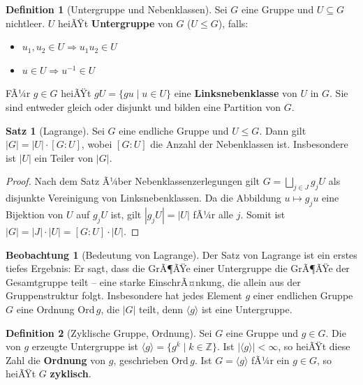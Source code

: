 ﻿\documentclass[a4paper,12pt]{report}
\theoremstyle{definition}
\newtheorem{definition}{Definition}
\newtheorem{satz}{Satz}
\newtheorem{beobachtung}{Beobachtung}
\begin{document}
\begin{definition}[Untergruppe und Nebenklassen]
    Sei $G$ eine Gruppe und $U \subseteq G$ nichtleer. $U$ heiÃŸt
    \textbf{Untergruppe} von $G$ ($U \le G$), falls:
    \begin{itemize}
        \item[-] $u_1, u_2 \in U \Rightarrow u_1 u_2 \in U$
        \item[-] $u \in U \Rightarrow u^{-1} \in U$
    \end{itemize}
    FÃ¼r $g \in G$ heiÃŸt $gU = \{gu \mid u \in U\}$ eine \textbf{Linksnebenklasse}
    von $U$ in $G$. Sie sind entweder gleich oder disjunkt und bilden eine
    Partition von $G$.
\end{definition}

\begin{satz}[Lagrange]
    Sei $G$ eine endliche Gruppe und $U \le G$. Dann gilt $|G| = |U| \cdot [G:U]$,
    wobei $[G:U]$ die Anzahl der Nebenklassen ist. Insbesondere ist $|U|$ ein
    Teiler von $|G|$.
\end{satz}
\begin{proof}
    Nach dem Satz Ã¼ber Nebenklassenzerlegungen gilt $G = \bigsqcup_{j \in J} g_j U$
    als disjunkte Vereinigung von Linksnebenklassen. Da die Abbildung
    $u \mapsto g_j u$ eine Bijektion von $U$ auf $g_j U$ ist, gilt
    $|g_j U| = |U|$ fÃ¼r alle $j$. Somit ist $|G| = |J| \cdot |U| = [G:U] \cdot |U|$.
\end{proof}


\begin{beobachtung}[Bedeutung von Lagrange]
    Der Satz von Lagrange ist ein erstes tiefes Ergebnis: Er sagt, dass die
    GrÃ¶ÃŸe einer Untergruppe die GrÃ¶ÃŸe der Gesamtgruppe teilt -- eine starke
    EinschrÃ¤nkung, die allein aus der Gruppenstruktur folgt. Insbesondere hat
    jedes Element $g$ einer endlichen Gruppe $G$ eine Ordnung $\mathrm{Ord}\, g$,
    die $|G|$ teilt, denn $\langle g \rangle$ ist eine Untergruppe.
\end{beobachtung}

\begin{definition}[Zyklische Gruppe, Ordnung]
    Sei $G$ eine Gruppe und $g \in G$. Die von $g$ erzeugte Untergruppe ist
    $\langle g \rangle = \{g^k \mid k \in \mathbb{Z}\}$.
    Ist $|\langle g \rangle| < \infty$, so heiÃŸt diese Zahl die
    \textbf{Ordnung} von $g$, geschrieben $\mathrm{Ord}\, g$.
    Ist $G = \langle g \rangle$ fÃ¼r ein $g \in G$, so heiÃŸt $G$ \textbf{zyklisch}.
\end{definition}
\end{document}
